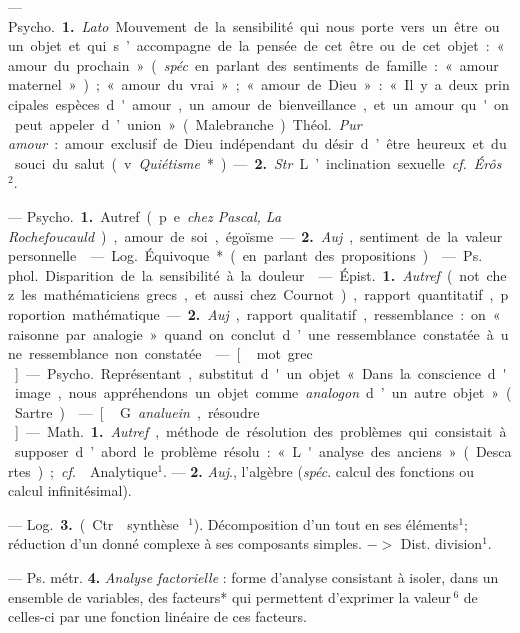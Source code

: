 \begin{itemize}[leftmargin=1cm, label=, itemsep=1pt]
{ — \si{Psycho.} {\bf 1.} {\it Lato}.
Mouvement de la sensibilité qui nous porte
vers un être ou un objet et qui s’accompagne de la pensée de cet être
ou de cet objet : « amour du prochain » ({\it spéc}. en parlant des
sentiments de famille : « amour maternel »); « amour du vrai » ; « amour de
Dieu » : « Il y a deux principales
espèces d'amour, un amour de bienveillance, et un amour qu'on peut
appeler d’union » (Malebranche).
\si{Théol.} {\it Pur amour} : amour exclusif
de Dieu indépendant du désir d’être
heureux et du souci du salut (v.
{\it Quiétisme}*). — {\bf 2.} {\it Str}. L’inclination
sexuelle. {\it cf.}  {\it Érôs}\,$^2$.

 — \si{Psycho.} {\bf 1.} Autref.
(p. e. {\it chez Pascal, La Rochefoucauld}),
amour de soi, égoïsme. — {\bf 2.} {\it Auj}.,
sentiment de la valeur personnelle.

 — \si{Log.} Équivoque*
(en parlant des propositions).

 — \si{Ps. phol.} Disparition
de la sensibilité à la douleur.

 — \si{Épist.} {\bf 1.} {\it Autref}. (not.
chez les mathématiciens grecs, et
aussi chez Cournot), rapport quantitatif, proportion mathématique. —
 {\bf 2.} {\it Auj}., rapport qualitatif, ressemblance : on « raisonne par analogie »
quand on conclut d’une ressemblance constatée à une ressemblance
non constatée.

 — [\,mot grec\,] — \si{Psycho.} Représentant,
substitut d'un objet
« Dans la conscience d'image, nous
appréhendons un objet comme {\it analogon} d’un autre objet » (Sartre).

 — [\,G. {\it analuein}, résoudre\,] —
\si{Math.} {\bf 1.} {\it Autref}., méthode de résolution des problèmes qui consistait
à supposer d’abord le problème résolu : « L'analyse des anciens »
(Descartes) ; {\it cf.}  {\it }Analytique$^1$. — {\bf 2.}
{\it Auj}., l'algèbre ({\it spéc}. calcul des fonctions ou calcul infinitésimal).

— \si{Log.} {\bf 3.} (Ctr. {\it }synthèse\,$^1$).
Décomposition d’un tout en ses éléments$^1$; réduction d'un donné
complexe à ses composants simples. $->$ Dist. division$^1$.

— Ps. métr. {\bf 4.} {\it Analyse factorielle} : forme d'analyse consistant à
isoler, dans un ensemble de variables,
des facteurs* qui permettent d’exprimer la valeur\,$^6$ de celles-ci par une
fonction linéaire de ces facteurs.

}
\end{itemize}
